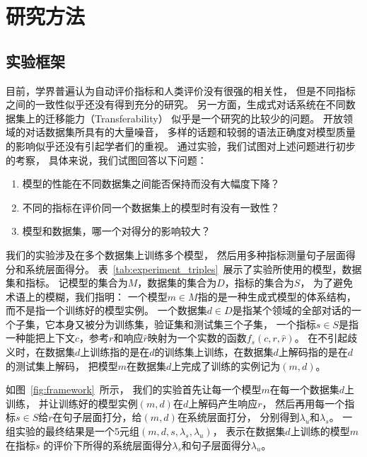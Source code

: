 
\chapter{研究方法}\label{ch:method}

\section{实验框架}\label{sec:eval_framework}
目前，学界普遍认为自动评价指标和人类评价没有很强的相关性，
但是不同指标之间的一致性似乎还没有得到充分的研究。
另一方面，生成式对话系统在不同数据集上的迁移能力（Transferability）
似乎是一个研究的比较少的问题。
开放领域的对话数据集所具有的大量噪音，
多样的话题和较弱的语法正确度对模型质量的影响似乎还没有引起学者们的重视。
通过实验，我们试图对上述问题进行初步的考察，
具体来说，我们试图回答以下问题：
\begin{enumerate}
    \item 模型的性能在不同数据集之间能否保持而没有大幅度下降？
    \item 不同的指标在评价同一个数据集上的模型时有没有一致性？
    \item 模型和数据集，哪一个对得分的影响较大？
\end{enumerate}

我们的实验涉及在多个数据集上训练多个模型，
然后用多种指标测量句子层面得分和系统层面得分。
表~\ref{tab:experiment_triples}~展示了实验所使用的模型，数据集和指标。
记模型的集合为$M$，数据集的集合为$D$，指标的集合为$S$，
为了避免术语上的模糊，我们指明：
一个模型$m \in M$指的是一种生成式模型的体系结构，而不是指一个训练好的模型实例。
一个数据集$d \in D$是指某个领域的全部对话的一个子集，它本身又被分为训练集，验证集和测试集三个子集，
一个指标$s \in S$是指一种能把上下文$c$，参考$r$和响应$\hat{r}$映射为一个实数的函数$f_s(c, r, \hat{r})$。
在不引起歧义时，在数据集$d$上训练指的是在$d$的训练集上训练，在数据集$d$上解码指的是在$d$的测试集上解码，
把模型$m$在数据集$d$上完成了训练的实例记为$(m, d)$。

如图~\ref{fig:framework}~所示，
我们的实验首先让每一个模型$m$在每一个数据集$d$上训练，
并让训练好的模型实例$(m, d)$在$d$上解码产生响应$r$，
然后再用每一个指标$s \in S$给$r$在句子层面打分，给$(m, d)$在系统层面打分，
分别得到$\lambda_{u}$和$\lambda_{s}$。
一组实验的最终结果是一个5元组$(m, d, s, \lambda_{s}, \lambda_{u})$，
表示在数据集$d$上训练的模型$m$在指标$s$
的评价下所得的系统层面得分$\lambda_s$和句子层面得分$\lambda_u$。

